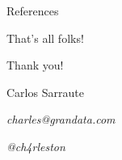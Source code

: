 \documentclass[usenames,dvipsnames]{beamer}
\begin{document}
\begin{frame}{References}
\justifying%

{}

\end{frame}

\begin{frame}{That's all folks!}
\centering
\begin{huge}
Thank you!
\end{huge}

\bigskip
\bigskip
\begin{Large}

Carlos Sarraute

\bigskip

\emph{charles@grandata.com}

\medskip
\emph{@ch4rleston}
\end{Large}

\end{frame}
\end{document}
